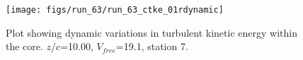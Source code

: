 \begin{figure}[H]
\centering
\texttt{[image: figs/run\_63/run\_63\_ctke\_01rdynamic]}
\caption{Plot showing dynamic variations in turbulent kinetic energy within the core. $z/c$=10.00, $V_{free}$=19.1, station 7.}
\end{figure}


